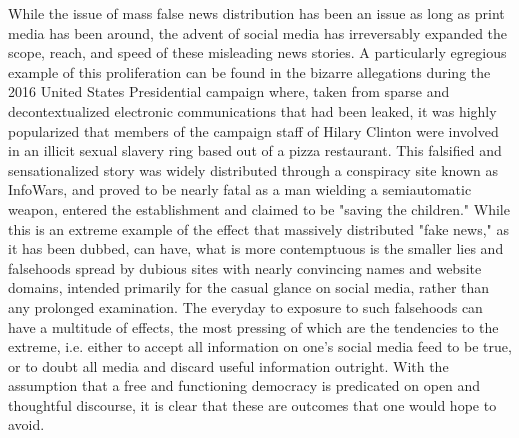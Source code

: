 \documentclass{article}
\begin{document}
While the issue of mass false news distribution has been an issue as long as print media has been around, the advent of social media has irreversably expanded the scope, reach, and speed of these misleading news stories. A particularly egregious example of this proliferation can be found in the bizarre allegations during the 2016 United States Presidential campaign where, taken from sparse and decontextualized electronic communications that had been leaked, it was highly popularized that members of the campaign staff of Hilary Clinton were involved in an illicit sexual slavery ring based out of a pizza restaurant. This falsified and sensationalized story was widely distributed through a conspiracy site known as InfoWars, and proved to be nearly fatal as a man wielding a semiautomatic weapon, entered the establishment and claimed to be "saving the children." While this is an extreme example of the effect that massively distributed "fake news," as it has been dubbed, can have, what is more contemptuous is the smaller lies and falsehoods spread by dubious sites with nearly convincing names and website domains, intended primarily for the casual glance on social media, rather than any prolonged examination. The everyday to exposure to such falsehoods can have a multitude of effects, the most pressing of which are the tendencies to the extreme, i.e. either to accept all information on one's social media feed to be true, or to doubt all media and discard useful information outright. With the assumption that a free and functioning democracy is predicated on open and thoughtful discourse, it is clear that these are outcomes that one would hope to avoid. \par
\end{document}
